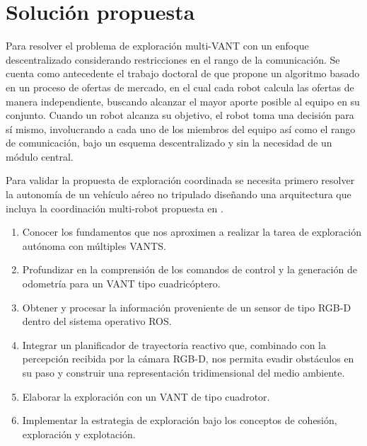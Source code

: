 \section{Solución propuesta}

Para resolver el problema de exploración multi-VANT con un enfoque descentralizado considerando restricciones en el rango de la comunicación. Se cuenta como antecedente el trabajo doctoral de \citeauthor{CINVESTAM2013} que propone un algoritmo basado en un proceso de ofertas de mercado, en el cual cada robot calcula las ofertas de manera independiente, buscando alcanzar el mayor aporte posible al equipo en su conjunto. Cuando un robot alcanza su objetivo, el robot toma una decisión para sí mismo, involucrando a cada uno de los miembros del equipo así como el rango de comunicación, bajo un esquema descentralizado y sin la necesidad de un módulo central.

Para validar la propuesta de exploración coordinada se necesita primero resolver la autonomía de un vehículo aéreo no tripulado diseñando una arquitectura que incluya la coordinación multi-robot propuesta en \cite{CINVESTAM2013}.

\begin{enumerate}\setlength{\itemsep}{-1mm}
\item Conocer los fundamentos que nos aproximen a realizar la tarea de exploración autónoma con múltiples VANTS.
\item Profundizar en la comprensión de los comandos de control y la generación de odometría para un VANT tipo cuadricóptero.
\item Obtener y procesar la información proveniente de un sensor de tipo RGB-D dentro del sistema operativo ROS.
\item Integrar un planificador de trayectoria reactivo que, combinado con la percepción recibida por la cámara RGB-D, nos permita evadir obstáculos en su paso y construir una representación tridimensional del medio ambiente.
\item Elaborar la exploración con un VANT de tipo cuadrotor.
\item Implementar la estrategia de exploración bajo los conceptos de cohesión, exploración y explotación.
\end{enumerate}





